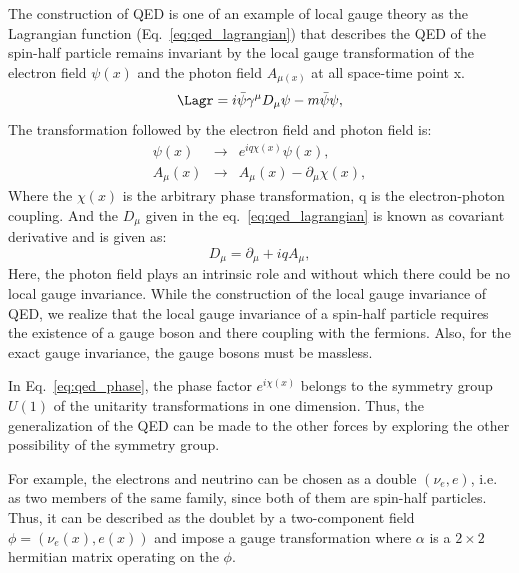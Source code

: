 The construction of QED is one of an example of local gauge theory as the Lagrangian function (Eq.~\ref{eq:qed_lagrangian}) that describes the QED of the spin-half particle remains invariant by the local gauge transformation of the electron field $\psi(x)$ and the photon field $A_{\mu(x)}$ at all space-time point x.
\begin{equation}\label{eq:qed_lagrangian}
    \Lagr = i \bar{\psi}\gamma^{\mu} D_{\mu}\psi - m\bar{\psi}\psi,
\end{equation}
The transformation followed by the electron field and photon field is:
\begin{eqnarray}\label{eq:qed_phase}
    \psi(x) & \rightarrow & e^{iq\chi(x)}\psi(x), \nonumber \\
    A_\mu(x) & \rightarrow & A_\mu(x) - {\partial_\mu \chi(x)}, 
\end{eqnarray}
Where the $\chi(x)$ is the arbitrary phase transformation, q is the electron-photon coupling.
And the $D_{\mu}$ given in the eq.~\ref{eq:qed_lagrangian} is known as covariant derivative and is given as:
\begin{equation}
    D_{\mu} = \partial_{\mu} + iqA_{\mu},
\end{equation}
Here, the photon field plays an intrinsic role and without which there could be no local gauge invariance. While the construction of the local gauge invariance of QED, we realize that the local gauge invariance of a spin-half particle requires the existence of a gauge boson and there coupling with the fermions. Also, for the exact gauge invariance, the gauge bosons must be massless. 

In Eq.~\ref{eq:qed_phase}, the phase factor $e^{i\chi(x)}$ belongs to the symmetry group $U(1)$ of the unitarity transformations in one dimension. Thus, the generalization of the QED can be made to the other forces by exploring the other possibility of the symmetry group.

For example, the electrons and neutrino can be chosen as a double $(\nu_e,e)$, i.e. as two members of the same family, since both of them are spin-half particles.
Thus, it can be described as the doublet by a two-component field $\phi = (\nu_e(x),e(x))$ and impose a gauge transformation where $\alpha$ is a $2\times 2$ hermitian matrix operating on the $\phi$.

